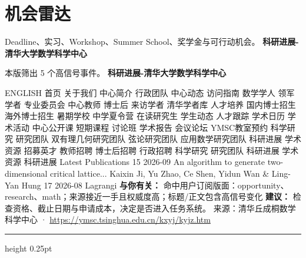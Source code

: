 \documentclass[10.5pt]{ctexart}
\begin{document}
\section*{机会雷达}
{\color{ormuted} Deadline、实习、Workshop、Summer School、奖学金与可行动机会。}
\vspace{2mm}
{\LARGE\bfseries 科研进展-清华大学数学科学中心}\par
\vspace{1mm}
{\color{ormuted} 本版筛出 5 个高信号事件。}
\vspace{3mm}
{\Large\bfseries 科研进展-清华大学数学科学中心}\par
ENGLISH 首页 关于我们 中心简介 行政团队 中心动态 访问指南 数学学人 领军学者 专业委员会 中心教师 博士后 来访学者 清华学者库 人才培养 国内博士招生 海外博士招生 暑期学校 中学夏令营 在读研究生 学生动态 人才跟踪 学术日历 学术活动 中心公开课 短期课程 讨论班 学术报告 会议论坛 YMSC教室预约 科学研究 研究团队 双有理几何研究团队 弦论研究团队 应用数学研究团队 科研进展 学术资源 招募英才 教师招聘 博士后招聘 行政招聘 科学研究 研究团队 科研进展 学术资源 科研进展 Latest Publications 15 2026-09 An algorithm to generate two-dimensional critical lattice... Kaixin Ji, Yu Zhao, Ce Shen, Yidun Wan \& Ling-Yan Hung 17 2026-08 Lagrangi
\textbf{与你有关：} 命中用户订阅版面：opportunity、research、math；来源接近一手且权威度高；标题/正文包含高信号变化
\textbf{建议：} 检查资格、截止日期与申请成本，决定是否进入任务系统。
{\footnotesize\color{ormuted} 来源：清华丘成桐数学科学中心 · \url{https://ymsc.tsinghua.edu.cn/kxyj/kyjz.htm}}
\vspace{4mm}
\hrule height 0.25pt
\vspace{3mm}
\end{document}
